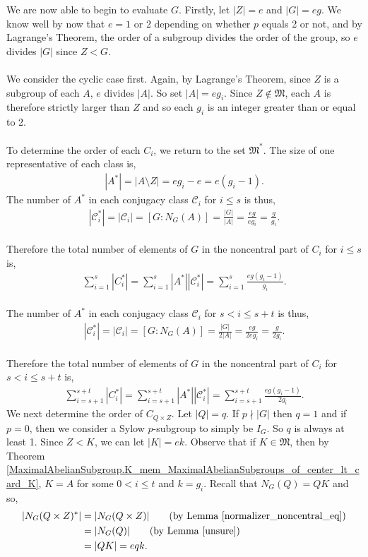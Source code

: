 We are now able to begin to evaluate $G$. Firstly, let $|Z| = e$ and $|G| = eg$. We know well by now that $e = 1$ or 2 depending on whether $p$ equals 2 or not, and by Lagrange's Theorem, the order of a subgroup divides the order of the group, so $e$ divides $|G|$ since $Z < G$. \\
\\
We consider the cyclic case first. Again, by Lagrange's Theorem, since $Z$ is a subgroup of each $A$, $e$ divides $|A|$. So set $|A| = eg_i$. Since $Z \notin \mathfrak{M}$, each $A$ is therefore strictly larger than $Z$ and so each $g_i$ is an integer greater than or equal to 2. \\
\\
To determine the order of each $C_i$, we return to the set $\mathfrak{M}^*$. The size of one representative of each class is,
\begin{align*} |A^*| = |A \! \setminus \! Z| = eg_i-e = e(g_i-1). \end{align*}
The number of $A^*$ in each conjugacy class $\mathcal{C}_i$ for $i \leq s$ is thus,
\begin{align*} |\mathcal{C}_i^*| = |\mathcal{C}_i| = [G:N_G(A)] = \frac{|G|}{|A|} = \frac{eg}{eg_i} = \frac{g}{g_i}. \end{align*}
\\
Therefore the total number of elements of $G$ in the noncentral part of $C_i$ for $i \leq s$ is,
\begin{align} \label{classeq1of3} \sum_{i=1}^{s} |C_i^*| = \sum_{i=1}^{s} |A^*| |\mathcal{C}_i^*| = \sum_{i=1}^{s} \frac{eg(g_i-1)}{g_i}.
\end{align}
\\
The number of $A^*$ in each conjugacy class $\mathcal{C}_i$ for $s < i \leq s+t$ is thus,
\begin{align*} |\mathcal{C}_i^*| = |\mathcal{C}_i| = [G:N_G(A)] = \frac{|G|}{2|A|} = \frac{eg}{2eg_i} = \frac{g}{2g_i}. \end{align*}
\\
Therefore the total number of elements of $G$ in the noncentral part of $C_i$ for $s < i \leq s+t$ is,
\begin{align}\label{classeq2of3} \sum_{i=s+1}^{s+t} |C_i^*| = \sum_{i=s+1}^{s+t} |A^*| |\mathcal{C}_i^*| = \sum_{i=s+1}^{s+t} \frac{eg(g_i-1)}{2g_i}.
\end{align}
We next determine the order of $C_{Q \times Z}$. Let $|Q| = q$. If $p \nmid |G|$ then $q=1$ and if $p = 0$, then we consider a Sylow $p$-subgroup to simply be $I_G$. So $q$ is always at least 1. Since $Z < K$, we can let $|K| = ek$. Observe that if $K \in \mathfrak{M}$, then by Theorem \ref{MaximalAbelianSubgroup.K_mem_MaximalAbelianSubgroups_of_center_lt_card_K}, $K = A$ for some $0 < i \leq t$ and $k = g_i$. Recall that $N_G(Q) = QK$ and so,
\begin{align*} |N_G(Q \times Z)^*| &= |N_G(Q \times Z)|  \tag{by Lemma \ref{normalizer_noncentral_eq}}
\\ &= |N_G(Q)| \tag{by Lemma \ref{unsure}}
\\ &= |QK| = eqk.
\end{align*}

